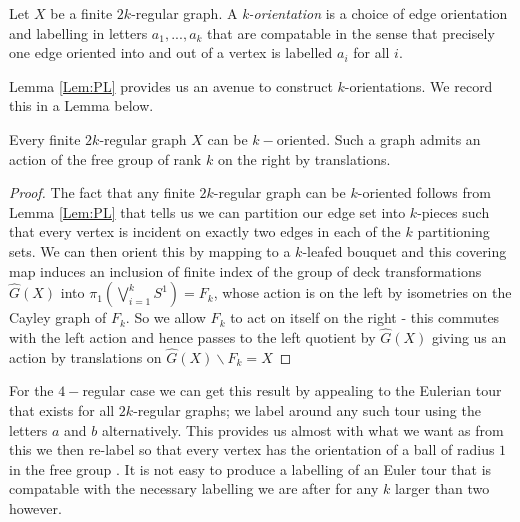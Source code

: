 \begin{definition}
Let $X$ be a finite $2k$-regular graph. A \textit{k-orientation} is a choice of edge orientation and labelling in letters $a_{1},...,a_{k}$ that are compatable in the sense that precisely one edge oriented into and out of a vertex is labelled $a_{i}$ for all $i$.
\end{definition}

Lemma \ref{Lem:PL} provides us an avenue to construct $k$-orientations. We record this in a Lemma below.
\begin{lemma}\label{Lem:MT1}
Every finite $2k$-regular graph $X$ can be $k-$oriented. Such a graph admits an action of the free group of rank $k$ on the right by translations.
\end{lemma}
\begin{proof}
The fact that any finite $2k$-regular graph can be $k$-oriented follows from Lemma \ref{Lem:PL} that tells us we can partition our edge set into $k$-pieces such that every vertex is incident on exactly two edges in each of the $k$ partitioning sets. We can then orient this by mapping to a $k$-leafed bouquet and this covering map induces an inclusion of finite index of the group of deck transformations $\widehat{G}(X)$ into $\pi_{1}(\bigvee_{i=1}^{k}S^{1})=F_{k}$, whose action is on the left by isometries on the Cayley graph of $F_{k}$. So we allow $F_{k}$ to act on itself on the right - this commutes with the left action and hence passes to the left quotient by $\widehat{G}(X)$ giving us an action by translations on $\widehat{G}(X)\backslash F_{k}=X$
\end{proof}

\begin{remark}
For the $4-$regular case we can get this result by appealing to the Eulerian tour that exists for all $2k$-regular graphs; we label around any such tour using the letters $a$ and $b$ alternatively. This provides us almost with what we want as from this we then re-label so that every vertex has the orientation of a ball of radius $1$ in the free group \cite[pg 57]{MR1867354}. It is not easy to produce a labelling of an Euler tour that is compatable with the necessary labelling we are after for any $k$ larger than two however.
\end{remark}

\begin{comment}
\begin{figure}[h]
\texttt{[image: Diagrams/Diagram3.png]}
\caption{Arriving at an action from an Euler Tour}
\label{Fig:AT}
\end{figure}
\end{comment}

